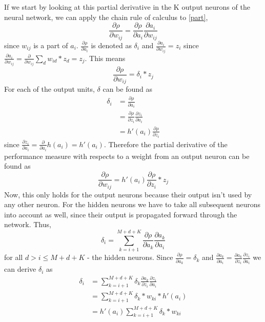 \documentclass[11pt]{article}
\begin{document}
If we start by looking at this partial derivative in the K output neurons of the
neural network, we can apply the chain rule of calculus to \ref{part},
\begin{equation}
    \frac{\partial \rho}{\partial w_{ij}} = \frac{\partial \rho}{\partial a_i} \frac{\partial a_i}{\partial w_{ij}} 
\end{equation}
since $w_{ij}$ is a part of $a_i$.
$\frac{\partial \rho}{\partial a_i}$ is denoted as $\delta_i$ and $\frac{\partial a_i}{\partial w_{ij}} = z_i$ since
$\frac{\partial a_i}{\partial w_{ij}} = \frac{\partial}{\partial w_{ij}} \sum_{d} w_{id} * z_d = z_j$.
This means
\begin{equation}\label{eq:der}
    \frac{\partial \rho}{\partial w_{ij}} = \delta_i * z_j  
\end{equation}
For each of the output units, $\delta$ can be found as
\begin{equation}
    \begin{aligned}
        \delta_i & = \frac{\partial \rho}{\partial a_i}\\
        & = \frac{\partial \rho}{\partial z_i} \frac{\partial z_i}{\partial a_i}\\
        & = h'(a_i) \frac{\partial \rho}{\partial z_i} 
    \end{aligned}
\end{equation}
since $\frac{\partial z_i}{\partial a_i} =  \frac{\partial}{\partial a_i} h(a_i) = h'(a_i)$.
Therefore the partial derivative of the performance measure with respects to a weight from
an output neuron can be found as
\begin{equation}
    \frac{\partial \rho}{\partial w_{ij}} = h'(a_i) \frac{\partial \rho}{\partial z_i} * z_j
\end{equation}
Now, this only holds for the output neurons because their output isn't
used by any other neuron.
For the hidden neurons we have to take all subsequent neurons into account as
well, since their output is propagated forward through the network.
Thus,
\begin{equation}
    \delta_i = \sum\limits_{k=i+1}^{M + d + K} \frac{\partial \rho}{\partial a_k} \frac{\partial a_k}{\partial a_i} 
\end{equation}
for all $d > i \leq M + d + K$ - the hidden neurons.
Since $\frac{\partial \rho}{\partial a_k} = \delta_k$ and
$\frac{\partial a_k}{\partial a_i} = \frac{\partial a_k}{\partial z_i} \frac{\partial z_i}{\partial a_i}$ we
can derive $\delta_i$ as
\begin{equation}
    \begin{aligned}
        \delta_i & = \sum\limits_{k=i+1}^{M + d + K} \delta_k \frac{\partial a_k}{\partial z_i} \frac{\partial z_i}{\partial a_i}\\
        & = \sum\limits_{k=i+1}^{M + d + K} \delta_k * w_{ki} *  h'(a_i)\\
        & = h'(a_i) \sum\limits_{k=i+1}^{M + d + K} \delta_k * w_{ki}
    \end{aligned}
\end{equation}
\end{document}

